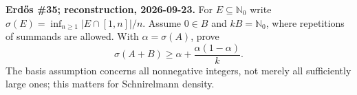 \textbf{Erd\H{o}s \#35; reconstruction, 2026-09-23.}
For $E\subseteq\mathbb N_0$ write
$\sigma(E)=\inf_{n\geq1}|E\cap[1,n]|/n$.
Assume $0\in B$ and $kB=\mathbb N_0$, where repetitions of summands
are allowed. With $\alpha=\sigma(A)$, prove
\[
 \sigma(A+B)\geq\alpha+\frac{\alpha(1-\alpha)}k.
\]
The basis assumption concerns all nonnegative integers, not merely
all sufficiently large ones; this matters for Schnirelmann density.
